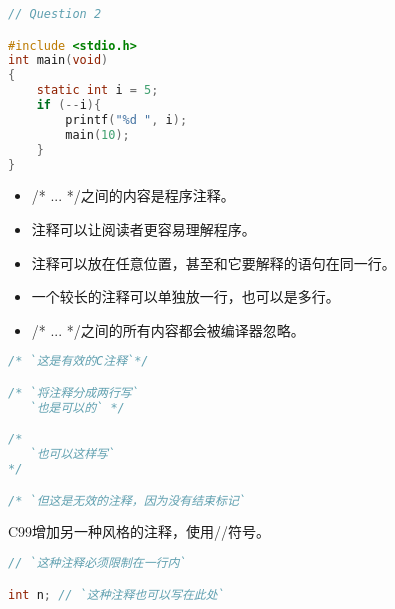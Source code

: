 \begin{frame}[fragile]
\begin{lstlisting}[language=c,frame=single]
// Question 2

#include <stdio.h>
int main(void)
{
    static int i = 5;
    if (--i){
        printf("%d ", i);
        main(10);
    }
}
\end{lstlisting}

\end{frame}

\begin{frame}
 

 


\begin{overprint}
\begin{itemize}
\item {\tf /* ... */}之间的内容是程序注释。\\[0.1in]
\item 注释可以让阅读者更容易理解程序。\\[0.1in]
\item 注释可以放在任意位置，甚至和它要解释的语句在同一行。\\[0.1in]
\item 一个较长的注释可以单独放一行，也可以是多行。\\[0.1in]
\item {\tf /* ... */}之间的所有内容都会被编译器忽略。
\end{itemize}
\end{overprint}

\end{frame}

\begin{frame}[fragile]
\begin{lstlisting}[language=c]
/* `这是有效的C注释`*/

/* `将注释分成两行写`
   `也是可以的` */

/*
   `也可以这样写`
*/

/* `但这是无效的注释，因为没有结束标记`
\end{lstlisting}
\end{frame}

\begin{frame}[fragile]
C99增加另一种风格的注释，使用{\tf //}符号。 \vspace{0.2in}


\begin{lstlisting}[language=c]
// `这种注释必须限制在一行内`

int n; // `这种注释也可以写在此处`
\end{lstlisting}
\end{frame}

